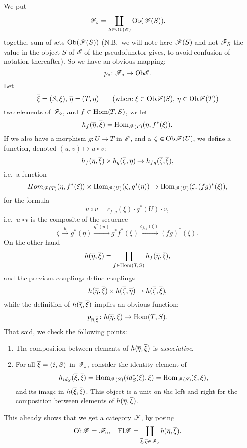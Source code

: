We put 
\[\mathscr{F}_\circ = \coprod_{S \in \mathrm{Ob} (\mathscr{E})} \mathrm{Ob}(\mathscr{F}(S)),\] 
together sum of sets $\mathrm{Ob}(\mathscr{F} (S))$ (N.B.\ we will note here $\mathscr{F}(S)$ and not $\mathscr{F}_S$ the value in the object $S$ of $\mathscr{E}$ of the pseudofunctor gives, to avoid confusion of notation thereafter). So we have an obvious mapping: 
\[p_\circ \colon \mathscr{F}_\circ \to \mathrm{Ob} \mathscr{E}.\]
Let 
\[\overline \xi = (S, \xi), \, \overline \eta = (T, \eta) \qquad (\text{where } \xi \in \mathrm{Ob} \mathscr{F}(S), \, \eta \in \mathrm{Ob} \mathscr{F}(T))\]
two elements of $\mathscr{F}_\circ$, and $f \in \mathrm{Hom}(T,S)$, we let
\[h_f(\overline \eta, \overline \xi) = \mathrm{Hom}_{\mathscr{F}(T)}(\eta, f^\ast(\xi)).\]
If we also have a morphism $g \colon U \to T$ in $\mathscr{E}$, and a $\zeta \in \mathrm{Ob} \mathscr{F} (U)$, we define a function, denoted $(u,v) \mapsto u \circ v$:
\[h_f(\overline \eta, \overline \xi) \times h_g(\overline \zeta, \overline \eta) \to h_{fg}(\overline \zeta, \overline \xi),\]
i.e.\ a function
\[Hom_{\mathscr{F}(T)} (\eta, f^\ast(\xi)) \times \mathrm{Hom}_{\mathscr{F}(U)} (\zeta, g^\ast(\eta)) \to \mathrm{Hom}_{\mathscr{F}(U)} (\zeta, (fg)^\ast(\xi)),\]
for the formula
\[u \circ v = c_{f,g} (\xi) \cdot g^\ast(U) \cdot v,\]
i.e.\ $u \circ v$ is the composite of the sequence 
\[
\zeta \xrightarrow{u} g^\ast(\eta) \xrightarrow{g^\ast(u)} g^\ast f^\ast(\xi) \xrightarrow{c_{f,g}(\xi)} (fg)^\ast(\xi).\]
On the other hand 
\[
    h(\overline \eta, \overline \xi) = \coprod_{f \in \mathrm{Hom}(T,S)} h_f(\overline \eta, \overline \xi),
\]
and the previous couplings define couplings
\[h(\overline \eta, \overline \xi) \times h(\overline \zeta, \overline \eta) \to h(\overline \zeta, \overline \xi),\]
while the definition of $h (\overline \eta, \overline \xi)$ implies an obvious function:
\[p_{\overline \eta, \overline \xi}
\colon h(\overline \eta, \overline \xi) \to \mathrm{Hom}(T, S).\]
That said, we check the following points:
\begin{enumerate}
    \item The composition between elements of $h (\overline \eta, \overline \xi)$ is \emph{associative}.
    \item For all $\overline \xi = (\xi, S)$ in $\mathscr{F}_\circ$, consider the identity element of
    \[h_{id_S} (\overline \xi, \overline \xi) = \mathrm{Hom}_{\mathscr{F}(S)} (id_S^\ast(\xi), \xi) = \mathrm{Hom}_{\mathscr{F}(S)}(\xi,\xi),\]
    and its image in $h (\overline \xi,\overline \xi)$. This object is a unit on the left and right for the composition between elements of $h (\overline \eta, \overline \xi)$.
\end{enumerate}

This already shows that we get a category $\mathscr{F}$, by posing
\[\mathrm{Ob} \mathscr{F} = \mathscr{F}_\circ, \quad \mathrm{Fl} \mathscr{F} = \coprod_{\overline \xi, \overline \eta \in \mathscr{F}_\circ} h(\overline \eta, \overline \xi).\]

